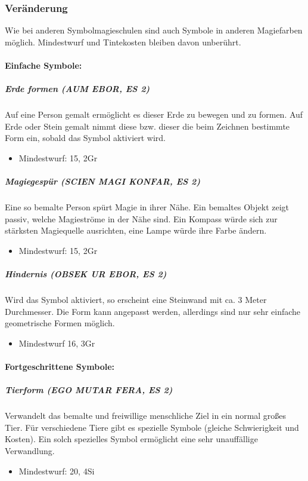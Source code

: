 \documentclass{article}
\begin{document}
\subsubsection{Veränderung}
Wie bei anderen Symbolmagieschulen sind auch Symbole in anderen Magiefarben möglich. Mindestwurf und Tintekosten bleiben davon unberührt.


\paragraph{Einfache Symbole:}

\subparagraph{Erde formen (AUM EBOR, ES 2)}
Auf eine Person gemalt ermöglicht es dieser Erde zu bewegen und zu formen. Auf Erde oder Stein gemalt nimmt diese bzw. dieser die beim Zeichnen bestimmte Form ein, sobald das Symbol aktiviert wird.
\begin{itemize}
\item Mindestwurf: 15, 2Gr
\end{itemize}

\subparagraph{Magiegespür (SCIEN MAGI KONFAR, ES 2)}
Eine so bemalte Person spürt Magie in ihrer Nähe. Ein bemaltes Objekt zeigt passiv, welche Magieströme in der Nähe sind. Ein Kompass würde sich zur stärksten Magiequelle ausrichten, eine Lampe würde ihre Farbe ändern.
\begin{itemize}
\item Mindestwurf: 15, 2Gr
\end{itemize}

\subparagraph{Hindernis (OBSEK UR EBOR, ES 2)}
Wird das Symbol aktiviert, so erscheint eine Steinwand mit ca. 3 Meter Durchmesser. Die Form kann angepasst werden, allerdings sind nur sehr einfache geometrische Formen möglich.
\begin{itemize}
\item Mindestwurf 16, 3Gr
\end{itemize}

\paragraph{Fortgeschrittene Symbole:}

\subparagraph{Tierform (EGO MUTAR FERA, ES 2)}
Verwandelt das bemalte und freiwillige menschliche Ziel in ein normal großes Tier. Für verschiedene Tiere gibt es spezielle Symbole (gleiche Schwierigkeit und Kosten). Ein solch spezielles Symbol ermöglicht eine sehr unauffällige Verwandlung.
\begin{itemize}
\item Mindestwurf: 20, 4Si
\end{itemize}
\end{document}
